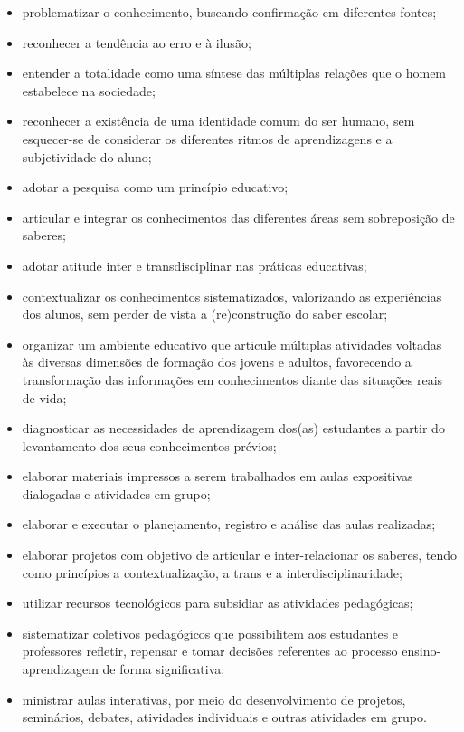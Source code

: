 \begin{itemize}
	\item problematizar o conhecimento, buscando confirmação em diferentes fontes;
	\item reconhecer a tendência ao erro e à ilusão;
	\item entender a totalidade como uma síntese das múltiplas relações que o homem estabelece na sociedade;
	\item reconhecer a existência de uma identidade comum do ser humano, sem esquecer-se de considerar os diferentes ritmos de aprendizagens e a subjetividade do aluno;
	\item adotar a pesquisa como um princípio educativo;
	\item articular e integrar os conhecimentos das diferentes áreas sem sobreposição de saberes;
	\item adotar atitude inter e transdisciplinar nas práticas educativas;
	\item contextualizar os conhecimentos sistematizados, valorizando as experiências dos alunos, sem perder de vista a (re)construção do saber escolar;
	\item organizar um ambiente educativo que articule múltiplas atividades voltadas às diversas dimensões de formação dos jovens e adultos, favorecendo a transformação das informações em conhecimentos diante das situações reais de vida;
	\item diagnosticar as necessidades de aprendizagem dos(as) estudantes a partir do levantamento dos seus conhecimentos prévios;
	\item elaborar materiais impressos a serem trabalhados em aulas expositivas dialogadas e atividades em grupo;
	\item elaborar e executar o planejamento, registro e análise das aulas realizadas;
	\item elaborar projetos com objetivo de articular e inter-relacionar os saberes, tendo como princípios a contextualização, a trans e a interdisciplinaridade;
	\item utilizar recursos tecnológicos para subsidiar as atividades pedagógicas;
	\item sistematizar coletivos pedagógicos que possibilitem aos estudantes e professores refletir, repensar e tomar decisões referentes ao processo ensino-aprendizagem de forma significativa;
	\item ministrar aulas interativas, por meio do desenvolvimento de projetos, seminários, debates, atividades individuais e outras atividades em grupo.
\end{itemize}

